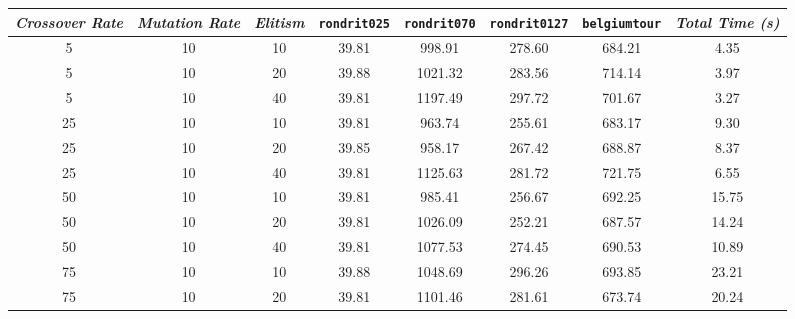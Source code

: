
\begin{table}[H]
\centering
\footnotesize
{\renewcommand{\arraystretch}{1}}
\begin{tabular}{ccc|c|c|c|c|c}
\textit{Crossover Rate} & \textit{Mutation Rate} & \textit{Elitism} & \texttt{rondrit025} & \texttt{rondrit070} & \texttt{rondrit0127} & \texttt{belgiumtour} & \textit{Total Time (s)} \\\hline
5 & 10 & 10 & \cellcolor{gray!80}39.81 & \cellcolor{gray!35}998.91 & \cellcolor{gray!1}278.60 & \cellcolor{gray!73}684.21 & 4.35\\
5 & 10 & 20 & \cellcolor{gray!80}39.88 & \cellcolor{gray!31}1021.32 & \cellcolor{gray!1}283.56 & \cellcolor{gray!64}714.14 & 3.97\\
5 & 10 & 40 & \cellcolor{gray!80}39.81 & \cellcolor{gray!2}1197.49 & \cellcolor{gray!1}297.72 & \cellcolor{gray!68}701.67 & 3.27\\
25 & 10 & 10 & \cellcolor{gray!80}39.81 & \cellcolor{gray!41}963.74 & \cellcolor{gray!7}255.61 & \cellcolor{gray!73}683.17 & 9.30\\
25 & 10 & 20 & \cellcolor{gray!80}39.85 & \cellcolor{gray!42}958.17 & \cellcolor{gray!1}267.42 & \cellcolor{gray!72}688.87 & 8.37\\
25 & 10 & 40 & \cellcolor{gray!80}39.81 & \cellcolor{gray!14}1125.63 & \cellcolor{gray!1}281.72 & \cellcolor{gray!61}721.75 & 6.55\\
50 & 10 & 10 & \cellcolor{gray!80}39.81 & \cellcolor{gray!37}985.41 & \cellcolor{gray!6}256.67 & \cellcolor{gray!71}692.25 & 15.75\\
50 & 10 & 20 & \cellcolor{gray!80}39.81 & \cellcolor{gray!30}1026.09 & \cellcolor{gray!10}252.21 & \cellcolor{gray!72}687.57 & 14.24\\
50 & 10 & 40 & \cellcolor{gray!80}39.81 & \cellcolor{gray!22}1077.53 & \cellcolor{gray!1}274.45 & \cellcolor{gray!71}690.53 & 10.89\\
75 & 10 & 10 & \cellcolor{gray!80}39.88 & \cellcolor{gray!27}1048.69 & \cellcolor{gray!1}296.26 & \cellcolor{gray!70}693.85 & 23.21\\
75 & 10 & 20 & \cellcolor{gray!80}39.81 & \cellcolor{gray!18}1101.46 & \cellcolor{gray!1}281.61 & \cellcolor{gray!76}673.74 & 20.24\\

\end{tabular}
\end{table}
